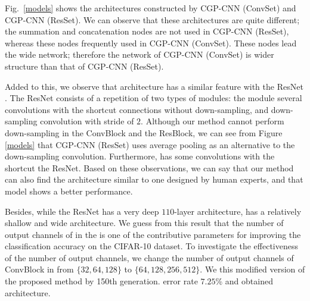 Fig.~\ref{models} shows the architectures constructed by CGP-CNN (ConvSet) and CGP-CNN (ResSet). We can observe that these architectures are quite different; the summation and concatenation nodes are not used in CGP-CNN (ResSet), whereas these nodes  frequently used in CGP-CNN (ConvSet). These nodes lead the wide network; therefore\new{,} the network of CGP-CNN (ConvSet) is  wider structure than that of CGP-CNN (ResSet).

Added to this, we observe that  architecture has a similar feature with the ResNet \cite{he_deep_2016}. The ResNet consists of a repetition of two types of modules: the module  several convolutions with the shortcut connections without down-sampling, and down-sampling convolution with  stride of $2$.  Although our method cannot perform down-sampling in the ConvBlock and the ResBlock, we can see from Figure \ref{models} that CGP-CNN (ResSet) uses average pooling as an alternative to the down-sampling convolution. Furthermore,  has some convolutions with the shortcut   the ResNet. Based on these observations, we can say that our method can also find the architecture similar to one designed by human experts, and that model shows a better performance.

Besides, while the ResNet has a very deep $110$-layer architecture,  has a relatively shallow and wide architecture.
We guess from this result that the number of output channels of  in the  is one of the contributive parameters for improving the classification accuracy on the CIFAR-10 dataset. To investigate the effectiveness of the number of output channels, we change the number of output channels of ConvBlock in  from $\{32, 64, 128\}$ to $\{64, 128, 256, 512\}$. We  this modified version of the proposed method by  150th generation.   error rate  $7.25$\% and  obtained  architecture.


